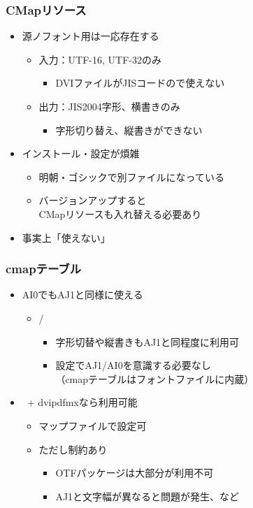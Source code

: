 \begin{frame}\frametitle{CMapリソース}
  \begin{itemize}
  \item 源ノフォント用は一応存在する
    \begin{itemize}
    \item 入力：UTF-16, UTF-32のみ
      \begin{itemize}
      \item DVIファイルがJISコードの\pTeX で使えない
      \end{itemize}
    \item 出力：JIS2004字形、横書きのみ
      \begin{itemize}
        \item 字形切り替え、縦書きができない
      \end{itemize}
    \end{itemize}
  \item インストール・設定が煩雑
    \begin{itemize}
    \item 明朝・ゴシックで別ファイルになっている
    \item バージョンアップすると \\
      CMapリソースも入れ替える必要あり
    \end{itemize}
  \item 事実上「使えない」
  \end{itemize}
\end{frame}

\begin{frame}\frametitle{cmapテーブル}
  \begin{itemize}
  \item AI0でもAJ1と同様に使える
    \begin{itemize}
    \item \LuaTeX /\XeTeX
      \begin{itemize}
      \item 字形切替や縦書きもAJ1と同程度に利用可
      \item 設定でAJ1/AI0を意識する必要なし \\
        （cmapテーブルはフォントファイルに内蔵）
      \end{itemize}
    \end{itemize}
  \item \upTeX \ + dvipdfmxなら利用可能
    \begin{itemize}
    \item マップファイルで設定可
    \item ただし制約あり
      \begin{itemize}
      \item OTFパッケージは大部分が利用不可
      \item AJ1と文字幅が異なると問題が発生、など
      \end{itemize}
    \end{itemize}
  \end{itemize}
\end{frame}

